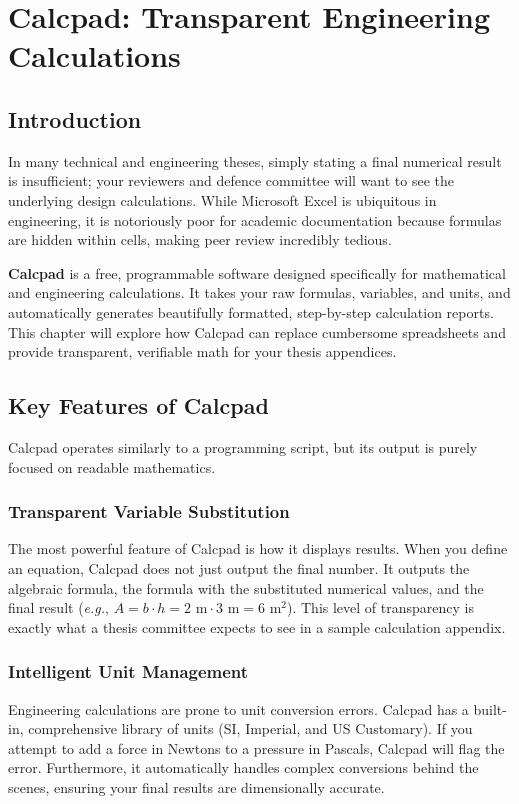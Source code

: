 \chapter{Calcpad: Transparent Engineering Calculations}\label{ch:calcpad}
	\section{Introduction}\label{sec:CalcpadIntroduction}
		In many technical and engineering theses, simply stating a final numerical result is insufficient; your reviewers and defence committee will want to see the underlying design calculations. 
		While Microsoft Excel is ubiquitous in engineering, it is notoriously poor for academic documentation because formulas are hidden within cells, making peer review incredibly tedious.

		\textbf{Calcpad} is a free, programmable software designed specifically for mathematical and engineering calculations. 
		It takes your raw formulas, variables, and units, and automatically generates beautifully formatted, step-by-step calculation reports. 
		This chapter will explore how Calcpad can replace cumbersome spreadsheets and provide transparent, verifiable math for your thesis appendices.

	\section{Key Features of Calcpad}
		Calcpad operates similarly to a programming script, but its output is purely focused on readable mathematics.

		\subsection{Transparent Variable Substitution}
			The most powerful feature of Calcpad is how it displays results. 
			When you define an equation, Calcpad does not just output the final number. 
			It outputs the algebraic formula, the formula with the substituted numerical values, and the final result (\textit{e.g.}, \(A = b \cdot h = 2\text{ m} \cdot 3\text{ m} = 6\text{ m}^2\)). 
			This level of transparency is exactly what a thesis committee expects to see in a sample calculation appendix.

		\subsection{Intelligent Unit Management}
			Engineering calculations are prone to unit conversion errors. 
			Calcpad has a built-in, comprehensive library of units (SI, Imperial, and US Customary). 
			If you attempt to add a force in Newtons to a pressure in Pascals, Calcpad will flag the error. 
			Furthermore, it automatically handles complex conversions behind the scenes, ensuring your final results are dimensionally accurate.

